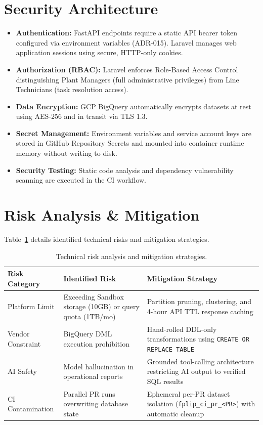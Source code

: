 \documentclass[12pt, a4paper]{report}
\begin{document}
\section{Security Architecture}
\begin{itemize}
    \item \textbf{Authentication:} FastAPI endpoints require a static API bearer token configured via environment variables (ADR-015). Laravel manages web application sessions using secure, HTTP-only cookies.
    \item \textbf{Authorization (RBAC):} Laravel enforces Role-Based Access Control distinguishing Plant Managers (full administrative privileges) from Line Technicians (task resolution access).
    \item \textbf{Data Encryption:} GCP BigQuery automatically encrypts datasets at rest using AES-256 and in transit via TLS 1.3.
    \item \textbf{Secret Management:} Environment variables and service account keys are stored in GitHub Repository Secrets and mounted into container runtime memory without writing to disk.
    \item \textbf{Security Testing:} Static code analysis and dependency vulnerability scanning are executed in the CI workflow.
\end{itemize}

\section{Risk Analysis \& Mitigation}
Table~\ref{tab:risk-analysis} details identified technical risks and mitigation strategies.

\begin{table}[h]
\centering
\begin{tabularx}{\textwidth}{p{3.0cm} X X}
\toprule
\textbf{\color{primary}Risk Category} & \textbf{\color{primary}Identified Risk} & \textbf{\color{primary}Mitigation Strategy} \\
\midrule
Platform Limit & Exceeding Sandbox storage (10GB) or query quota (1TB/mo) & Partition pruning, clustering, and 4-hour API TTL response caching \\
Vendor Constraint & BigQuery DML execution prohibition & Hand-rolled DDL-only transformations using \texttt{CREATE OR REPLACE TABLE} \\
AI Safety & Model hallucination in operational reports & Grounded tool-calling architecture restricting AI output to verified SQL results \\
CI Contamination & Parallel PR runs overwriting database state & Ephemeral per-PR dataset isolation (\texttt{fplip\_ci\_pr\_<PR>}) with automatic cleanup \\
\bottomrule
\end{tabularx}
\caption{Technical risk analysis and mitigation strategies.}
\label{tab:risk-analysis}
\end{table}
\end{document}
